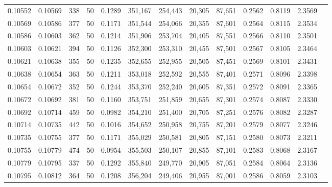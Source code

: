 \begin{tabular}{rrrrrrrrrrrrr}
0.10552 & 0.10569 &   338 &  50 &                                     0.1289 & 351,167 & 254,443 &  20,305 &  87,651 & 0.2562 & 0.8119 & 2.3569 \\
0.10569 & 0.10586 &   377 &  50 &                                     0.1171 & 351,544 & 254,066 &  20,355 &  87,601 & 0.2564 & 0.8115 & 2.3534 \\
0.10586 & 0.10603 &   362 &  50 &                                     0.1214 & 351,906 & 253,704 &  20,405 &  87,551 & 0.2566 & 0.8110 & 2.3501 \\
0.10603 & 0.10621 &   394 &  50 &                                     0.1126 & 352,300 & 253,310 &  20,455 &  87,501 & 0.2567 & 0.8105 & 2.3464 \\
0.10621 & 0.10638 &   355 &  50 &                                     0.1235 & 352,655 & 252,955 &  20,505 &  87,451 & 0.2569 & 0.8101 & 2.3431 \\
0.10638 & 0.10654 &   363 &  50 &                                     0.1211 & 353,018 & 252,592 &  20,555 &  87,401 & 0.2571 & 0.8096 & 2.3398 \\
0.10654 & 0.10672 &   352 &  50 &                                     0.1244 & 353,370 & 252,240 &  20,605 &  87,351 & 0.2572 & 0.8091 & 2.3365 \\
0.10672 & 0.10692 &   381 &  50 &                                     0.1160 & 353,751 & 251,859 &  20,655 &  87,301 & 0.2574 & 0.8087 & 2.3330 \\
0.10692 & 0.10714 &   459 &  50 &                                     0.0982 & 354,210 & 251,400 &  20,705 &  87,251 & 0.2576 & 0.8082 & 2.3287 \\
0.10714 & 0.10735 &   442 &  50 &                                     0.1016 & 354,652 & 250,958 &  20,755 &  87,201 & 0.2579 & 0.8077 & 2.3246 \\
0.10735 & 0.10755 &   377 &  50 &                                     0.1171 & 355,029 & 250,581 &  20,805 &  87,151 & 0.2580 & 0.8073 & 2.3211 \\
0.10755 & 0.10779 &   474 &  50 &                                     0.0954 & 355,503 & 250,107 &  20,855 &  87,101 & 0.2583 & 0.8068 & 2.3167 \\
0.10779 & 0.10795 &   337 &  50 &                                     0.1292 & 355,840 & 249,770 &  20,905 &  87,051 & 0.2584 & 0.8064 & 2.3136 \\
0.10795 & 0.10812 &   364 &  50 &                                     0.1208 & 356,204 & 249,406 &  20,955 &  87,001 & 0.2586 & 0.8059 & 2.3103 \\

\end{tabular}
